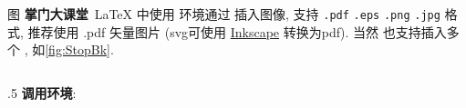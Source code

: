 \begin{frame}{图}
	\textbf{掌门大课堂}~\LaTeX{} 中使用  环境通过  插入图像, 支持 \texttt{.pdf} \texttt{.eps} \texttt{.png} \texttt{.jpg} 格式, 推荐使用 \alert{\ttfamily .pdf} 矢量图片 (svg可使用 \href{https://inkscape.org/}{\color{scublue}Inkscape} 转换为pdf). 当然  也支持插入多个 , 如\cref{fig:StopBk}.\\[-2ex]
	\begin{columns}[T, onlytextwidth]
		\begin{column}{.5\textwidth}
			\textbf{调用环境}:\\
			\\
			\hspace*{1em}\\
			\hspace*{1em}\\
			\hspace*{1em}\\
			\\[1ex]


\end{column}
\end{columns}
\end{frame}
